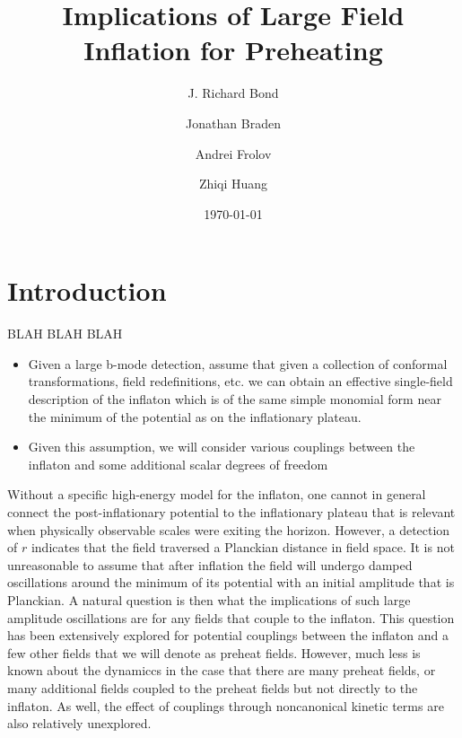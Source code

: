 \documentclass[a4paper,11pt]{article}
\begin{document}
\title{Implications of Large Field Inflation for Preheating}
\author[a]{J. Richard Bond}
\author[a,b]{Jonathan Braden}
\author[c]{Andrei Frolov}
\author[a]{Zhiqi Huang}


\date{\today}
\maketitle

\section{Introduction}
BLAH BLAH BLAH
\begin{itemize}
  \item Given a large b-mode detection, assume that given a collection of conformal transformations, field redefinitions, etc. we can obtain an effective single-field description of the inflaton which is of the same simple monomial form near the minimum of the potential as on the inflationary plateau.
  \item Given this assumption, we will consider various couplings between the inflaton and some additional scalar degrees of freedom
\end{itemize}
Without a specific high-energy model for the inflaton, one cannot in general connect the post-inflationary potential to the inflationary plateau that is relevant when physically observable scales were exiting the horizon.
However, a detection of $r$ indicates that the field traversed a Planckian distance in field space.
It is not unreasonable to assume that after inflation the field will undergo damped oscillations around the minimum of its potential with an initial amplitude that is Planckian.
A natural question is then what the implications of such large amplitude oscillations are for any fields that couple to the inflaton.
This question has been extensively explored for potential couplings between the inflaton and a few other fields that we will denote as preheat fields.
However, much less is known about the dynamiccs in the case that there are many preheat fields, or many additional fields coupled to the preheat fields but not directly to the inflaton.
As well, the effect of couplings through noncanonical kinetic terms are also relatively unexplored.
\end{document}
